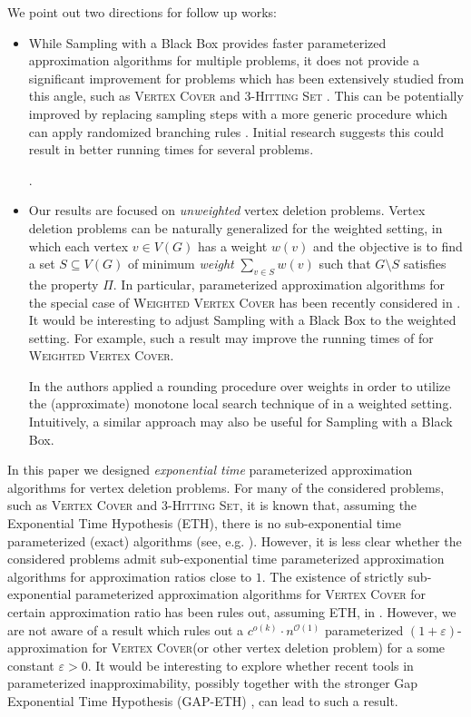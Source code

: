 \documentclass[letterpaper,11pt]{article}
\newcommand{\1}[1]{\mathds{1}\left[#1\right]}
\newcommand{\eps}{\varepsilon}
\newcommand{\Oh}{\mathcal{O}}
\newcommand{\wvc}{\textsc{Weighted Vertex Cover}\xspace}
\newcommand{\vc}{\textsc{Vertex Cover}\xspace}
\newcommand{\hs}[1]{\ensuremath{#1}\textsc{-Hitting Set}\xspace}
\begin{document}
We point out two directions for follow up works:
\begin{itemize}
	\item 
While Sampling with a Black Box provides faster parameterized approximation algorithms for multiple problems, it does  not provide a significant improvement for problems which has been extensively studied from this angle, such as \vc  and \hs{3} \cite{brankovicParameterizedApproximationAlgorithms2012, BF13,Fellows2018,KulikS2020}. This can be potentially improved by replacing sampling steps with a more generic procedure which can apply randomized branching rules \cite{KulikS2020}.  Initial research suggests this could result in better running times for several problems.

.

	\item 
	Our results are focused on {\em unweighted } vertex deletion problems. Vertex deletion problems can be naturally generalized for the weighted setting, in which each vertex $v\in V(G)$ has a weight $w(v)$ and the objective is to find a set $S\subseteq V(G)$ of minimum {\em weight} $\sum_{v\in S} w(v)$ such that $G\setminus S$ satisfies the property $\Pi$. 
	In particular, parameterized approximation algorithms for the special case of \wvc  has been recently considered in \cite{MMRS24}. 
	It would be interesting to adjust Sampling with a Black Box to the weighted setting. For example, such a result may  improve the running times of \cite{MMRS24} for \wvc. 
	
	In \cite{EKMNS23} the authors applied a rounding procedure over weights in order to utilize the (approximate) monotone local search technique of \cite{EKMNS24}  in a weighted setting. Intuitively, a similar approach may also be useful for Sampling with a Black Box.  
\end{itemize}

In this paper we designed {\em exponential time} parameterized approximation algorithms for vertex deletion problems.
For many of the considered problems, such as \vc and \hs{3}, it is known that, assuming the Exponential Time Hypothesis (ETH), there is no sub-exponential time parameterized (exact) algorithms (see, e.g. \cite{cyganParameterizedAlgorithms2015a}). However, it is less clear whether the considered problems admit sub-exponential time  parameterized approximation algorithms for approximation ratios close to $1$.  The existence of strictly sub-exponential parameterized  approximation algorithms for \vc for certain approximation ratio has been rules out, assuming ETH, in \cite{BEKP15}. However, we are not aware of a result which rules out a $c^{o(k)}\cdot n^{\Oh(1)}$ parameterized $(1+\eps)$-approximation for \vc (or other vertex deletion problem) for a some constant $\eps>0$. 
It would be interesting to explore whether recent tools in parameterized inapproximability, possibly together with  the stronger  Gap Exponential Time Hypothesis  (GAP-ETH) \cite{Din16,Manu17}, can lead to such a result. 
\end{document}
